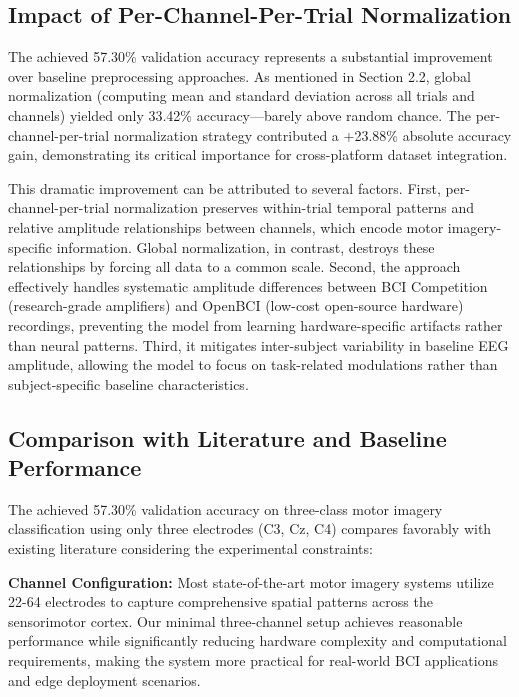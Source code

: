 \subsection{Impact of Per-Channel-Per-Trial Normalization}

The achieved 57.30\% validation accuracy represents a substantial improvement over baseline preprocessing approaches. As mentioned in Section 2.2, global normalization (computing mean and standard deviation across all trials and channels) yielded only 33.42\% accuracy—barely above random chance. The per-channel-per-trial normalization strategy contributed a +23.88\% absolute accuracy gain, demonstrating its critical importance for cross-platform dataset integration.

This dramatic improvement can be attributed to several factors. First, per-channel-per-trial normalization preserves within-trial temporal patterns and relative amplitude relationships between channels, which encode motor imagery-specific information. Global normalization, in contrast, destroys these relationships by forcing all data to a common scale. Second, the approach effectively handles systematic amplitude differences between BCI Competition (research-grade amplifiers) and OpenBCI (low-cost open-source hardware) recordings, preventing the model from learning hardware-specific artifacts rather than neural patterns. Third, it mitigates inter-subject variability in baseline EEG amplitude, allowing the model to focus on task-related modulations rather than subject-specific baseline characteristics.

\subsection{Comparison with Literature and Baseline Performance}

The achieved 57.30\% validation accuracy on three-class motor imagery classification using only three electrodes (C3, Cz, C4) compares favorably with existing literature considering the experimental constraints:

\textbf{Channel Configuration:} Most state-of-the-art motor imagery systems utilize 22-64 electrodes to capture comprehensive spatial patterns across the sensorimotor cortex. Our minimal three-channel setup achieves reasonable performance while significantly reducing hardware complexity and computational requirements, making the system more practical for real-world BCI applications and edge deployment scenarios.

